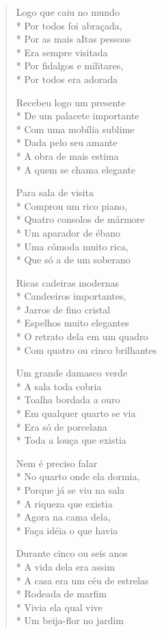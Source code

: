 \begin{verse}
Logo que caiu no mundo\\*
Por todos foi abraçada,\\*
Por as mais aItas pessoas\\*
Era sempre visitada\\*
Por fidalgos e militares,\\*
Por todos era adorada

Recebeu logo um presente\\*
De um palacete importante\\*
Com uma mobília sublime\\*
Dada pelo seu amante\\*
A obra de mais estima\\*
A quem se chama elegante

Para sala de visita\\*
Comprou um rico piano,\\*
Quatro consolos de mármore\\*
Um aparador de ébano\\*
Uma cômoda muito rica,\\*
Que só a de um soberano

Ricas cadeiras modernas\\*
Candeeiros importantes,\\*
Jarros de fino cristal\\*
Espelhos muito elegantes\\*
O retrato dela em um quadro\\*
Com quatro ou cinco brilhantes

Um grande damasco verde\\*
A sala toda cobria\\*
Toalha bordada a ouro\\*
Em qualquer quarto se via\\*
Era só de porcelana\\*
Toda a louça que existia

Nem é preciso falar\\*
No quarto onde ela dormia,\\*
Porque já se viu na sala\\*
A riqueza que existia\\*
Agora na cama dela,\\*
Faça idéia o que havia

Durante cinco ou seis anos\\*
A vida dela era assim\\*
A casa era um céu de estrelas\\*
Rodeada de marfim\\*
Vivia ela qual vive\\*
Um beija-flor no jardim


\end{verse}
